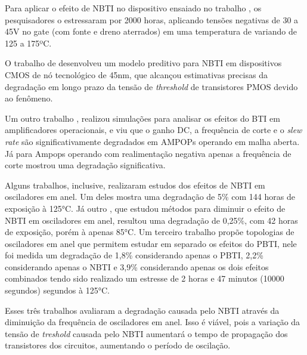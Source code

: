 Para aplicar o efeito de NBTI no dispositivo ensaiado no trabalho \cite{Davidovic}, os pesquisadores o estressaram por 2000 horas, aplicando tensões negativas de 30 a 45V no gate (com fonte e dreno aterrados) em uma temperatura de variando de 125 a 175ºC.

O trabalho de \cite{Bhardwaj} desenvolveu um modelo preditivo para NBTI em dispositivos CMOS de nó tecnológico de 45nm, que alcançou estimativas precisas da degradação em longo prazo da tensão de \textit{threshold} de transistores PMOS devido ao fenômeno.

Um outro trabalho \cite{Grossi}, realizou simulações para analisar os efeitos do BTI em amplificadores operacionais, e viu que o ganho DC, a frequência de corte e o \textit{slew rate} são significativamente degradados em AMPOPs operando em malha aberta. Já para Ampops operando com realimentação negativa apenas a frequência de corte mostrou uma degradação significativa.

Alguns trabalhos, inclusive, realizaram estudos dos efeitos de NBTI em osciladores em anel. Um deles \cite{Lorenz} mostra uma degradação de 5\% com 144 horas de exposição à 125°C. Já outro \cite{Sato}, que estudou métodos para diminuir o efeito de NBTI em osciladores em anel, resultou uma degradação de 0,25\%, com 42 horas de exposição, porém à apenas 85°C. Um terceiro trabalho \cite{Linder} propõe topologias de osciladores em anel que permitem estudar em separado os efeitos do PBTI, nele foi medida um degradação de 1,8\% considerando apenas o PBTI, 2,2\% considerando apenas o NBTI e 3,9\%  considerando apenas os dois efeitos combinados tendo sido realizado um estresse de 2 horas e 47 minutos (10000 segundos) segundos à 125°C.

Esses três trabalhos avaliaram a degradação causada pelo NBTI através da diminuição da frequência de osciladores em anel. Isso é viável, pois a variação da tensão de \textit{treshold} causada pelo NBTI aumentará o tempo de propagação dos transistores dos circuitos, aumentando o período de oscilação. 